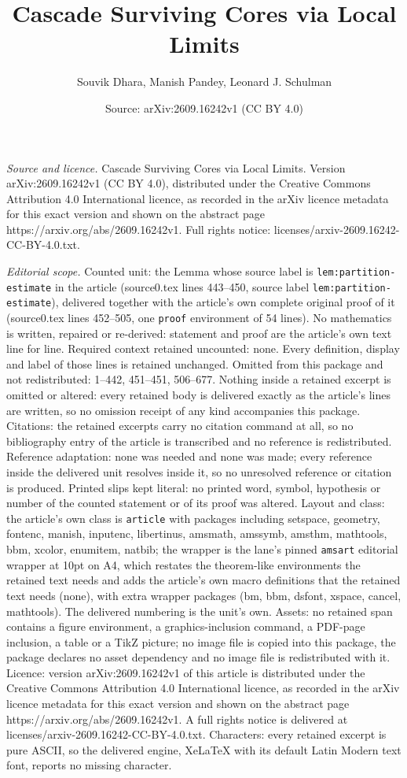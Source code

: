 \documentclass[10pt,a4paper]{amsart}
\title[Cascade Surviving Cores via Local Limits]{Cascade Surviving Cores via Local Limits}
\author{Souvik Dhara, Manish Pandey, Leonard J. Schulman}
\date{Source: arXiv:2609.16242v1 (CC BY 4.0)}
\begin{document}
\maketitle

\noindent\emph{Source and licence.} Cascade Surviving Cores via Local Limits. Version arXiv:2609.16242v1 (CC BY 4.0), distributed under the Creative Commons Attribution 4.0 International licence, as recorded in the arXiv licence metadata for this exact version and shown on the abstract page https://arxiv.org/abs/2609.16242v1. Full rights notice: licenses/arxiv-2609.16242-CC-BY-4.0.txt.\par\smallskip

\noindent\textit{Editorial scope.} Counted unit: the Lemma whose source label is \texttt{lem:partition-estimate} in the article (source0.tex lines 443--450, source label \texttt{lem:partition-estimate}), delivered together with the article's own complete original proof of it (source0.tex lines 452--505, one \texttt{proof} environment of 54 lines). No mathematics is written, repaired or re-derived: statement and proof are the article's own text line for line. Required context retained uncounted: none. Every definition, display and label of those lines is retained unchanged. Omitted from this package and not redistributed: 1--442, 451--451, 506--677. Nothing inside a retained excerpt is omitted or altered: every retained body is delivered exactly as the article's lines are written, so no omission receipt of any kind accompanies this package. Citations: the retained excerpts carry no citation command at all, so no bibliography entry of the article is transcribed and no reference is redistributed. Reference adaptation: none was needed and none was made; every reference inside the delivered unit resolves inside it, so no unresolved reference or citation is produced. Printed slips kept literal: no printed word, symbol, hypothesis or number of the counted statement or of its proof was altered. Layout and class: the article's own class is \texttt{article} with packages including setspace, geometry, fontenc, manish, inputenc, libertinus, amsmath, amssymb, amsthm, mathtools, bbm, xcolor, enumitem, natbib; the wrapper is the lane's pinned \texttt{amsart} editorial wrapper at 10pt on A4, which restates the theorem-like environments the retained text needs and adds the article's own macro definitions that the retained text needs (none), with extra wrapper packages (bm, bbm, dsfont, xspace, cancel, mathtools). The delivered numbering is the unit's own. Assets: no retained span contains a figure environment, a graphics-inclusion command, a PDF-page inclusion, a table or a TikZ picture; no image file is copied into this package, the package declares no asset dependency and no image file is redistributed with it. Licence: version arXiv:2609.16242v1 of this article is distributed under the Creative Commons Attribution 4.0 International licence, as recorded in the arXiv licence metadata for this exact version and shown on the abstract page https://arxiv.org/abs/2609.16242v1. A full rights notice is delivered at licenses/arxiv-2609.16242-CC-BY-4.0.txt. Characters: every retained excerpt is pure ASCII, so the delivered engine, XeLaTeX with its default Latin Modern text font, reports no missing character.
\end{document}
